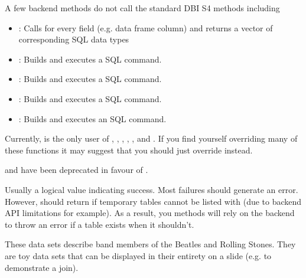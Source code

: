 \documentclass[a4paper]{book}
\begin{document}
%
\begin{Details}
A few backend methods do not call the standard DBI S4 methods including
\begin{itemize}

\item{} : Calls  for every field
(e.g. data frame column) and returns a vector of corresponding SQL data
types
\item{} : Builds and executes a
 SQL command.
\item{} : Builds and executes a
 SQL command.
\item{} : Builds and executes a
 SQL command.
\item{} : Builds and executes an
 SQL command.

\end{itemize}


Currently,  is the only user of , ,
, , ,  and
. If you find yourself overriding many of these
functions it may suggest that you should just override 
instead.

 and  have been deprecated
in favour of .
\end{Details}
%
\begin{Value}
Usually a logical value indicating success. Most failures should generate
an error. However,  should return  if
temporary tables cannot be listed with  (due to backend
API limitations for example). As a result, you methods will rely on the
backend to throw an error if a table exists when it shouldn't.
\end{Value}
%
\begin{Description}
These data sets describe band members of the Beatles and Rolling Stones. They
are toy data sets that can be displayed in their entirety on a slide (e.g. to
demonstrate a join).
\end{Description}
\end{document}
